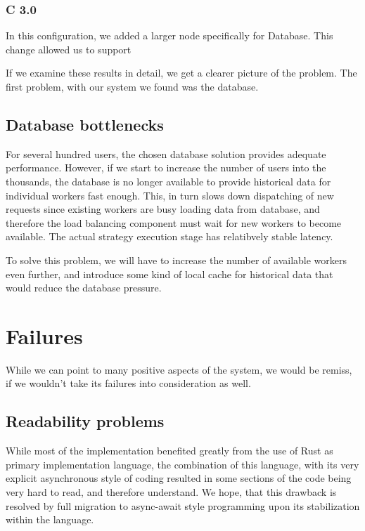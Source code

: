 \subsubsection{C 3.0}
In this configuration, we added a larger node specifically for Database. This change allowed us to support






If we examine these results in detail, we get a clearer picture of the problem. The first problem, with our system
we found was the database.

\subsection{Database bottlenecks}
For several hundred users, the chosen database solution provides adequate performance. However, if we start to increase the number
of users into the thousands, the database is no longer available to provide historical data for individual workers fast enough.
This, in turn slows down dispatching of new requests since existing workers are busy loading data from database, and therefore the
load balancing component must wait for new workers to become available. The actual strategy execution stage has relatibvely
stable latency.

To solve this problem, we will have to increase the number of available workers even further, and introduce some kind of
local cache for historical data that would reduce the database pressure.

\section{Failures}
While we can point to many positive aspects of the system, we would be remiss, if we wouldn't take its failures
into consideration as well.

\subsection{Readability problems}
While most of the implementation benefited greatly from the use of Rust as primary implementation language, the combination
of this language, with its very explicit asynchronous style of coding resulted in some sections of the code being
very hard to read, and therefore understand. We hope, that this drawback is resolved by full migration
to async-await style programming upon its stabilization within the language.

